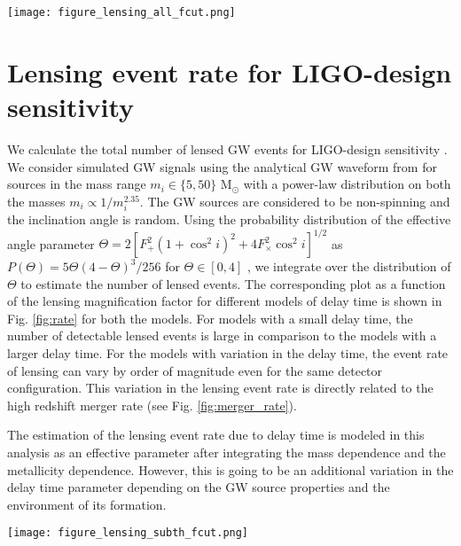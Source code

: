 \documentclass[a4paper,useAMS,usenatbib]{mnras}
\begin{document}
\begin{figure*}
    \centering
    \texttt{[image: figure\_lensing\_all\_fcut.png]}
    \caption{We plot the expected lensing event rate as a function of magnification for different values of the delay time parameters, which can be detected with the matched-filtering SNR $\rho_{th} \geq 8$ with the LIGO-design sensitivity.}
    \label{fig:rate}
\end{figure*}

\section{Lensing event rate for LIGO-design sensitivity }\label{lensingrate}
We calculate the total number of lensed GW events for LIGO-design sensitivity \citep{Aasi:2013wya, TheLIGOScientific:2014jea}. We consider simulated GW signals using the analytical GW waveform from \citep{Ajith:2007kx} for sources in the mass range $m_i \in \{5,50\}$ M$_\odot$ with a power-law distribution on both the masses $m_i \propto 1/m^{2.35}_i$. The GW sources are considered to be non-spinning and the inclination angle is random. Using the probability distribution of the effective angle parameter $\Theta= 2 [F^2_+ (1+\cos^2{i})^2 + 4F^2_\times\cos^2{i}]^{1/2}$ \citep{Finn:1992xs, Finn:1995ah} as $P(\Theta)= 5\Theta(4-\Theta)^3/256$ for $\Theta \in [0,4]$ \citep{Finn:1992xs, Finn:1995ah}, we integrate over the distribution of $\Theta$ to estimate the number of lensed events. The corresponding plot as a function of the lensing magnification factor for different models of delay time is shown in Fig. \ref{fig:rate} for both the models. For models with a small delay time, the number of detectable lensed events is large in comparison to the models with a larger delay time. For the models with variation in the delay time, the event rate of lensing can vary by order of magnitude even for the same detector configuration. This variation in the lensing event rate is directly related to the high redshift merger rate (see Fig. \ref{fig:merger_rate}).

The estimation of the lensing event rate due to delay time is modeled in this analysis as an effective parameter after integrating the mass dependence and the metallicity dependence. However, this is going to be an additional variation in the delay time parameter depending on the GW source properties and the environment of its formation. 

\begin{figure*}
\centering
\texttt{[image: figure\_lensing\_subth\_fcut.png]}

\caption{We show the lensing event rate as a function of matched-filtering SNR $\rho_{th}$,  for different values of the magnification factor $\mu=2$ and  $\mu=30$ and for different values of the delay time parameter $t^{eff}_d= 0.1$ Gyr and $t^{eff}_d= 10$ Gyr.}
\label{fig:sub_th2}
\end{figure*}
\end{document}
